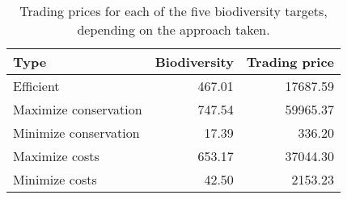 \begin{table}

\caption{\label{tab:trading-prices}Trading prices for each of the five biodiversity targets, depending on the approach taken.}
\centering
\begin{tabular}[t]{l|r|r}
\hline
Type & Biodiversity & Trading price\\
\hline
Efficient & 467.01 & 17687.59\\
\hline
Maximize conservation & 747.54 & 59965.37\\
\hline
Minimize conservation & 17.39 & 336.20\\
\hline
Maximize costs & 653.17 & 37044.30\\
\hline
Minimize costs & 42.50 & 2153.23\\
\hline
\end{tabular}
\end{table}